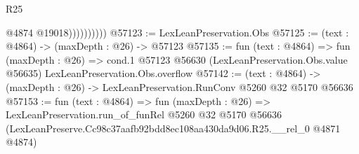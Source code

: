 \begin{lexlean}{R25}
\begin{coremodule}
                        @4874
                        @19018))))))))))
@57123 := LexLeanPreservation.Obs
@57125 := (text : @4864) -> (maxDepth : @26) -> @57123
@57135 := fun (text : @4864) =>
  fun (maxDepth : @26) =>
  cond.{1} @57123 @56630 (LexLeanPreservation.Obs.value @56635) LexLeanPreservation.Obs.overflow
@57142 := (text : @4864) -> (maxDepth : @26) -> LexLeanPreservation.RunConv @5260 @32 @5170 @56636
@57153 := fun (text : @4864) =>
  fun (maxDepth : @26) =>
  LexLeanPreservation.run_of_funRel
    @5260
    @32
    @5170
    @56636
    (LexLeanPreserve.Cc98c37aafb92bdd8ec108aa430da9d06.R25.__rel_0 @4871 @4874)
\end{coremodule}
\end{lexlean}
